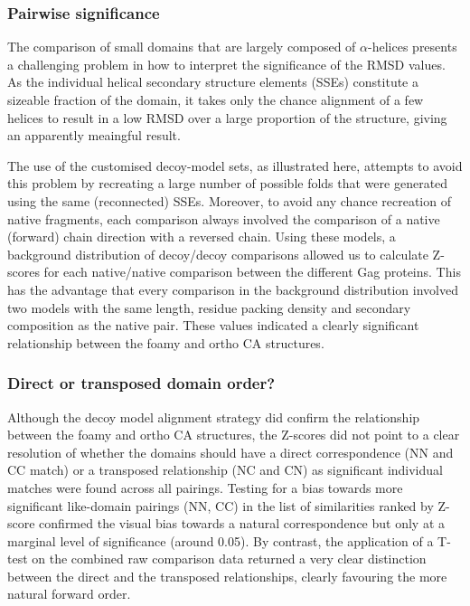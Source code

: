 \documentclass{bmcart}
\newcommand{\A}{$\alpha$}
\begin{document}
\subsubsection*{Pairwise significance}

The comparison of small domains that are largely composed of \A-helices presents a challenging problem in how
to interpret the significance of the RMSD values.  As the individual helical secondary structure elements
(SSEs) constitute a sizeable fraction of the domain, it takes only the chance alignment of a few helices
to result in a low RMSD over a large proportion of the structure, giving an apparently meaingful result.

The use of the customised decoy-model sets, as illustrated here, attempts to avoid this problem by recreating
a large number of possible folds that were generated using the same (reconnected) SSEs. Moreover, to avoid any
chance recreation of native fragments, each comparison always involved the comparison of a native (forward)
chain direction with a reversed chain.  Using these models, a background distribution of decoy/decoy comparisons
allowed us to calculate Z-scores for each native/native comparison between the different Gag proteins. This has
the advantage that every comparison in the background distribution involved two models with the same length,
residue packing density and secondary composition as the native pair.  These values indicated a clearly
significant relationship between the foamy and ortho CA structures.

\subsubsection*{Direct or transposed domain order?}

Although the decoy model alignment strategy did confirm the relationship between the foamy and ortho CA
structures, the Z-scores did not point to a clear resolution of whether the domains should have a direct
correspondence (NN and CC match) or a transposed relationship (NC and CN) as significant individual matches
were found across all pairings. Testing for a bias towards more significant like-domain pairings (NN, CC)
in the list of similarities ranked by Z-score confirmed the visual bias towards a natural correspondence
but only at a marginal level of significance (around 0.05). By contrast, the application of a T-test on the
combined raw comparison data returned a very clear distinction between the direct and the transposed
relationships, clearly favouring the more natural forward order.
\end{document}
